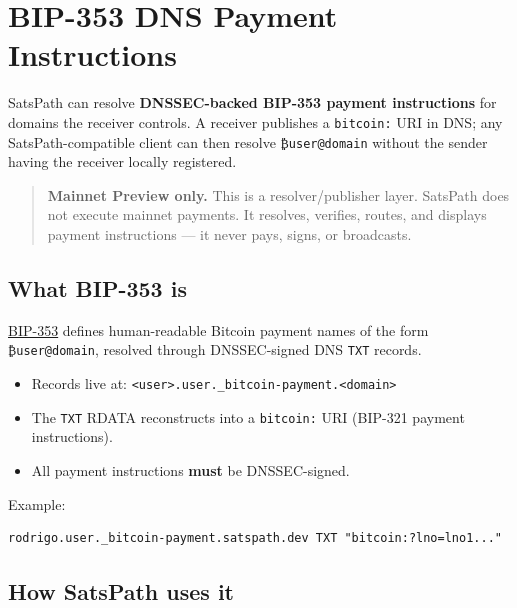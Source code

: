 \documentclass[
]{article}
\author{}
\date{}
\providecommand{\tightlist}{%
  \setlength{\itemsep}{0pt}\setlength{\parskip}{0pt}}
\begin{document}
\hypertarget{bip-353-dns-payment-instructions}{%
\section{BIP-353 DNS Payment
Instructions}\label{bip-353-dns-payment-instructions}}

SatsPath can resolve \textbf{DNSSEC-backed BIP-353 payment instructions}
for domains the receiver controls. A receiver publishes a
\texttt{bitcoin:} URI in DNS; any SatsPath-compatible client can then
resolve \texttt{₿user@domain} without the sender having the receiver
locally registered.

\begin{quote}
\textbf{Mainnet Preview only.} This is a resolver/publisher layer.
SatsPath does not execute mainnet payments. It resolves, verifies,
routes, and displays payment instructions --- it never pays, signs, or
broadcasts.
\end{quote}

\hypertarget{what-bip-353-is}{%
\subsection{What BIP-353 is}\label{what-bip-353-is}}

\href{https://github.com/bitcoin/bips/blob/master/bip-0353.mediawiki}{BIP-353}
defines human-readable Bitcoin payment names of the form
\texttt{₿user@domain}, resolved through DNSSEC-signed DNS \texttt{TXT}
records.

\begin{itemize}
\tightlist
\item
  Records live at:
  \texttt{\textless{}user\textgreater{}.user.\_bitcoin-payment.\textless{}domain\textgreater{}}
\item
  The \texttt{TXT} RDATA reconstructs into a \texttt{bitcoin:} URI
  (BIP-321 payment instructions).
\item
  All payment instructions \textbf{must} be DNSSEC-signed.
\end{itemize}

Example:

\begin{verbatim}
rodrigo.user._bitcoin-payment.satspath.dev TXT "bitcoin:?lno=lno1..."
\end{verbatim}

\hypertarget{how-satspath-uses-it}{%
\subsection{How SatsPath uses it}\label{how-satspath-uses-it}}
\end{document}
